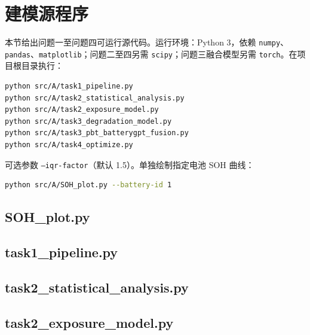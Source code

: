 \section{建模源程序}
\label{app:code}

本节给出问题一至问题四可运行源代码。运行环境：Python 3，依赖 \texttt{numpy}、\texttt{pandas}、\texttt{matplotlib}；问题二至四另需 \texttt{scipy}；问题三融合模型另需 \texttt{torch}。在项目根目录执行：
\begin{lstlisting}[language=bash]
python src/A/task1_pipeline.py
python src/A/task2_statistical_analysis.py
python src/A/task2_exposure_model.py
python src/A/task3_degradation_model.py
python src/A/task3_pbt_batterygpt_fusion.py
python src/A/task4_optimize.py
\end{lstlisting}
可选参数 \texttt{--iqr-factor}（默认 1.5）。单独绘制指定电池 SOH 曲线：
\begin{lstlisting}[language=bash]
python src/A/SOH_plot.py --battery-id 1
\end{lstlisting}

\subsection{SOH\_plot.py}



\subsection{task1\_pipeline.py}



\subsection{task2\_statistical\_analysis.py}



\subsection{task2\_exposure\_model.py}



